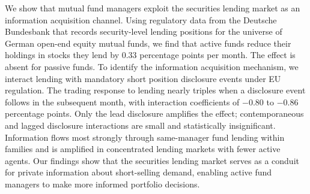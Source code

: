 We show that mutual fund managers exploit the securities lending market as an information acquisition channel. Using regulatory data from the Deutsche Bundesbank that records security-level lending positions for the universe of German open-end equity mutual funds, we find that active funds reduce their holdings in stocks they lend by 0.33 percentage points per month. The effect is absent for passive funds. To identify the information acquisition mechanism, we interact lending with mandatory short position disclosure events under EU regulation. The trading response to lending nearly triples when a disclosure event follows in the subsequent month, with interaction coefficients of $-0.80$ to $-0.86$ percentage points. Only the lead disclosure amplifies the effect; contemporaneous and lagged disclosure interactions are small and statistically insignificant. Information flows most strongly through same-manager fund lending within families and is amplified in concentrated lending markets with fewer active agents. Our findings show that the securities lending market serves as a conduit for private information about short-selling demand, enabling active fund managers to make more informed portfolio decisions.
